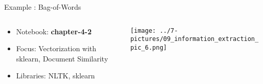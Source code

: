 \documentclass[11pt]{beamer}
\begin{document}
\begin{frame}{Example : Bag-of-Words}
\begin{columns}[T] %
\begin{column}{.48\textwidth}
        \begin{itemize}
		\item Notebook: \textbf{chapter-4-2}
		\item Focus: Vectorization with sklearn, Document Similarity
		\item Libraries: NLTK, sklearn
        \end{itemize}
\end{column}%
\hfill%
\begin{column}{.48\textwidth}
        \texttt{[image: ../7-pictures/09\_information\_extraction\_pic\_6.png]}
\end{column}%
\end{columns}
\end{frame}
\end{document}
